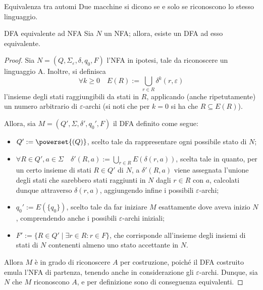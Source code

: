 \documentclass[a4paper, 12pt]{report}
\begin{document}
    \begin{frameddefn}{Equivalenza tra automi}
        Due macchine si dicono  se e solo se riconoscono lo stesso linguaggio.
    \end{frameddefn}

    \begin{framedthm}[label={nfa equiv}]{DFA equivalente ad NFA}
        Sia $N$ un NFA; allora, esiste un DFA ad esso equivalente.
    \end{framedthm}

    \begin{proof}
        Sia $N = (Q, \Sigma_{\varepsilon}, \delta, q_0, F)$ l'NFA in ipotesi, tale da riconoscere un linguaggio A. Inoltre, si definisca $$\forall k \ge 0 \quad \displaystyle E(R) := \bigcup_{r \in R}{\delta^k(r, \varepsilon)}$$ l'insieme degli stati raggiungibili da stati in $R$, applicando (anche ripetutamente) un numero arbitrario di $\varepsilon$-archi (si noti che per $k = 0$ si ha che $R \subseteq E(R)$).

        Allora, sia $M = (Q', \Sigma, \delta', q_0', F)$ il DFA definito come segue:

        \begin{itemize}
            \item $Q' := \powerset{(Q)}$, scelto tale da rappresentare ogni possibile stato di $N$;
            \item $\displaystyle \forall R \in Q', a \in \Sigma \quad \delta'(R, a) := \bigcup_{r \in R}{E(\delta(r, a))}$, scelta tale in quanto, per un certo insieme di stati $R \in Q'$ di $N$, a $\delta'(R, a)$ viene assegnata l'unione degli stati che sarebbero stati raggiunti in $N$ dagli $r \in R$ con $a$, calcolati dunque attraverso $\delta(r, a)$, aggiungendo infine i possibili $\varepsilon$-archi;
            \item $q_0' := E(\{q_0\})$, scelto tale da far iniziare $M$ esattamente dove aveva inizio $N$, comprendendo anche i possibili $\varepsilon$-archi iniziali;
            \item $F' := \{R \in Q' \mid \exists r \in R : r \in F\}$, che corrisponde all'insieme degli insiemi di stati di $N$ contenenti almeno uno stato accettante in $N$.
        \end{itemize}

        Allora $M$ è in grado di riconoscere $A$ per costruzione, poiché il DFA costruito emula l'NFA di partenza, tenendo anche in considerazione gli $\varepsilon$-archi. Dunque, sia $N$ che $M$ riconoscono $A$, e per definizione sono di conseguenza equivalenti.
    \end{proof}
    
\end{document}
